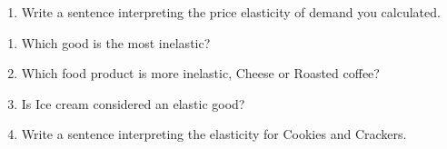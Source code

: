 \documentclass[11pt]{article}
\begin{document}
\begin{enumerate}
\begin{enumerate}
    \item Write a sentence interpreting the price elasticity of demand you calculated.
  \end{enumerate}
  
  \newpage
\begin{table}[htbp]
    \centering
    \caption{Estimates of the Price Elasticity of Demand for Selected Food Products}
\end{table}
	\begin{enumerate}
    \item Which good is the most inelastic?
    
    \item Which food product is more inelastic, Cheese or Roasted coffee?
    
    \item Is Ice cream considered an elastic good?
    
    \item Write a sentence interpreting the elasticity for Cookies and Crackers.
  \end{enumerate}
  

\end{enumerate}
\end{document}
